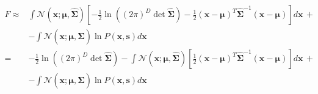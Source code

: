 \documentclass[a4paper, 10pt]{article}
\begin{document}
\begin{equation}
\label{eqn:f1}
\begin{split}
F \approx & \int \mathcal{N}(\mathbf x; \bm \mu, \bm{\hat{\Sigma}}) \left[ -\frac{1}{2} \ln \left( (2 \pi)^{D} \det \bm{\hat{\Sigma}} \right) - \frac{1}{2} (\mathbf x-\boldsymbol \mu)^T \boldsymbol{\hat{\Sigma}}^{-1} (\mathbf x-\boldsymbol \mu) \right] d \mathbf x \, + \\
	& - \int \mathcal{N}(\mathbf x;\bm \mu,\bm{\hat{\Sigma}}) \ln P(\mathbf x,\mathbf s) d \mathbf x \\
    = & -\frac{1}{2} \ln \left( (2 \pi)^{D} \det \bm{\hat{\Sigma}} \right) - \int \mathcal{N}(\mathbf x; \bm \mu, \bm{\hat{\Sigma}}) \left[ \frac{1}{2} (\mathbf x-\boldsymbol \mu)^T \boldsymbol{\hat{\Sigma}}^{-1} (\mathbf x-\boldsymbol \mu) \right] d \mathbf x \, + \\
    & - \int \mathcal{N}(\mathbf x;\bm \mu,\bm{\hat{\Sigma}}) \ln P(\mathbf x,\mathbf s) d \mathbf x 
\end{split}
\end{equation}
\end{document}
